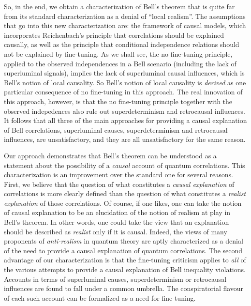 \documentclass[letterpaper,onecolumn,nofootinbib]{revtex4}
\begin{document}
So, in the end, we obtain a characterization of Bell's theorem that is quite far from its standard characterization as a denial of ``local realism''.  
The assumptions that go into this new characterization are: the framework of causal models, which incorporates Reichenbach's principle that correlations should be explained causally, as well as the principle that conditional independence relations should not be explained by fine-tuning.  As we shall see, the no fine-tuning principle, applied to the observed independences in a Bell scenario (including the lack of superluminal signals), implies the lack of superluminal causal influences, which is Bell's notion of local causality.  So Bell's notion of local causality is {\em derived} as one particular consequence of no fine-tuning in this approach.  The real innovation of this approach, however, is that the no fine-tuning principle together with the observed indepedences also rule out superdeterminism and retrocausal influences.   It follows that all three of the main approaches for providing a causal explanation of Bell correlations, superluminal causes, superdeterminism and retrocausal influences, are unsatisfactory, and they are all unsatisfactory for the same reason. 

Our approach demonstrates that Bell's theorem can be understood as a statement about the possibility of a {\em causal} account of quantum correlations. This characterization is an improvement over the standard one for several reasons.   First, we believe that the question of what constitutes a {\em causal explanation} of correlations is more clearly defined than the question of what constitutes a {\em realist explanation} of those correlations.  Of course, if one likes,  one can take the notion of causal explanation to be an elucidation of the notion of realism at play in Bell's theorem.  In other words, one could take the view that an explanation should be described as {\em realist} only if it is causal. Indeed, the views of many proponents of {\em anti-realism} in quantum theory are aptly characterized as a denial of the need to provide a causal explanation of quantum correlations.  The second advantage of our characterization is that the fine-tuning criticism applies to {\em all} of the various attempts to provide a causal explanation of Bell inequality violations.  Accounts in terms of superluminal causes, superdeterminism or retrocausal influences are found to fall under a common umbrella.  The conspiratorial flavour of each such account can be formalized as a need for fine-tuning. 
\end{document}
